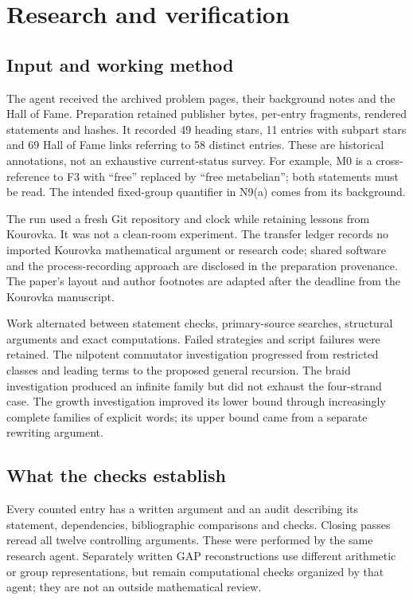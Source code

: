 \section{Research and verification}\label{sec:experiment}

\subsection{Input and working method}
The agent received the archived problem pages, their background notes
and the Hall of Fame. Preparation retained publisher bytes, per-entry
fragments, rendered statements and hashes. It recorded 49 heading stars,
11 entries with subpart stars and 69 Hall of Fame links referring to
58 distinct entries. These are historical annotations, not an exhaustive
current-status survey. For example, M0 is a cross-reference to F3 with
``free'' replaced by ``free metabelian''; both statements must be read.
The intended fixed-group quantifier in N9(a) comes from its background.

The run used a fresh Git repository and clock while retaining lessons
from Kourovka. It was not a clean-room experiment. The transfer ledger
records no imported Kourovka mathematical argument or research code;
shared software and the process-recording approach are disclosed in
the preparation provenance. The paper's layout and author footnotes are
adapted after the deadline from the Kourovka manuscript.

Work alternated between statement checks, primary-source searches,
structural arguments and exact computations. Failed strategies and
script failures were retained. The nilpotent commutator investigation
progressed from restricted classes and leading terms to the proposed
general recursion. The braid investigation produced an infinite family
but did not exhaust the four-strand case. The growth investigation
improved its lower bound through increasingly complete families of
explicit words; its upper bound came from a separate rewriting argument.

\subsection{What the checks establish}
Every counted entry has a written argument and an audit describing its
statement, dependencies, bibliographic comparisons and checks. Closing
passes reread all twelve controlling arguments. These were performed by
the same research agent. Separately written GAP reconstructions use
different arithmetic or group representations, but remain computational
checks organized by that agent; they are not an outside mathematical review.

